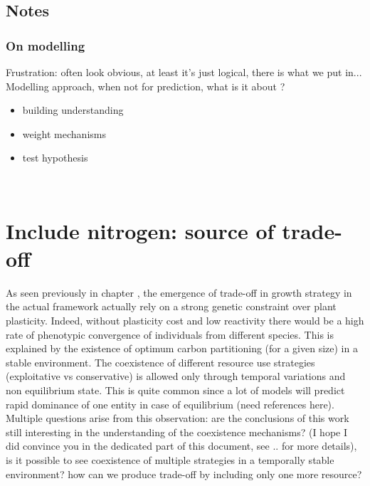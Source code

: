 


\section{Notes}

\subsection{On modelling}
Frustration: often look obvious, at least it's just logical, there is what we put in...\\

Modelling approach, when not for prediction, what is it about ?
\begin{itemize}
\item building understanding
\item weight mechanisms
\item test hypothesis
\end{itemize}
\

\chapter{Include nitrogen: source of trade-off} %

As seen previously in chapter %
, the emergence of trade-off in growth strategy in the actual framework actually rely on a strong genetic constraint over plant plasticity. Indeed, without plasticity cost and low reactivity there would be a high rate of phenotypic convergence of individuals from different species. This is explained by the existence of optimum carbon partitioning (for a given size) in a stable environment. The coexistence of different resource use strategies (exploitative vs conservative) is allowed only through temporal variations and non equilibrium state. This is quite common since a lot of models will predict rapid dominance of one entity in case of equilibrium (need references here).\\
Multiple questions arise from this observation: are the conclusions of this work still interesting in the understanding of the coexistence mechanisms? (I hope I did convince you in the dedicated part of this document, see .. for more details), is it possible to see coexistence of multiple strategies in a temporally stable environment? how can we produce trade-off by including only one more resource?\\

